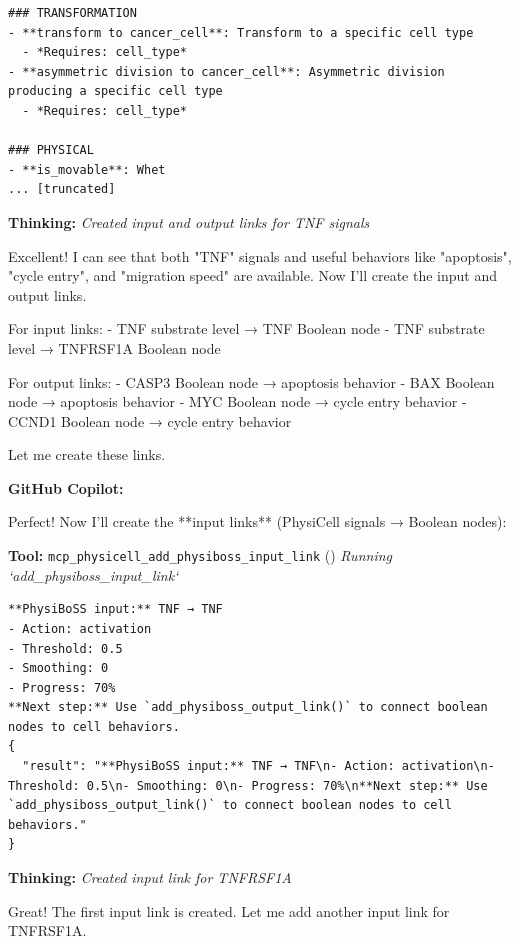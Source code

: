 \documentclass[11pt,a4paper]{article}
\begin{document}
\begin{toolokbox}
\begin{lstlisting}
### TRANSFORMATION
- **transform to cancer_cell**: Transform to a specific cell type
  - *Requires: cell_type*
- **asymmetric division to cancer_cell**: Asymmetric division producing a specific cell type
  - *Requires: cell_type*

### PHYSICAL
- **is_movable**: Whet
... [truncated]
\end{lstlisting}
\end{toolokbox}
\begin{thinkbox}
\textbf{Thinking:} \textit{Created input and output links for TNF signals}

Excellent! I can see that both "TNF" signals and useful behaviors like "apoptosis", "cycle entry", and "migration speed" are available. Now I'll create the input and output links.

For input links:
- TNF substrate level → TNF Boolean node 
- TNF substrate level → TNFRSF1A Boolean node

For output links:
- CASP3 Boolean node → apoptosis behavior
- BAX Boolean node → apoptosis behavior  
- MYC Boolean node → cycle entry behavior
- CCND1 Boolean node → cycle entry behavior

Let me create these links.

\end{thinkbox}
\begin{copilotbox}
\textbf{GitHub Copilot:}

Perfect! Now I'll create the **input links** (PhysiCell signals → Boolean nodes):

\end{copilotbox}
\begin{toolokbox}
\textbf{Tool:} \texttt{mcp\_physicell\_add\_physiboss\_input\_link} (\checkmark)
\textit{Running `add\_physiboss\_input\_link`}
\begin{lstlisting}
**PhysiBoSS input:** TNF → TNF
- Action: activation
- Threshold: 0.5
- Smoothing: 0
- Progress: 70%
**Next step:** Use `add_physiboss_output_link()` to connect boolean nodes to cell behaviors.
{
  "result": "**PhysiBoSS input:** TNF → TNF\n- Action: activation\n- Threshold: 0.5\n- Smoothing: 0\n- Progress: 70%\n**Next step:** Use `add_physiboss_output_link()` to connect boolean nodes to cell behaviors."
}
\end{lstlisting}
\end{toolokbox}
\begin{thinkbox}
\textbf{Thinking:} \textit{Created input link for TNFRSF1A}

Great! The first input link is created. Let me add another input link for TNFRSF1A.

\end{thinkbox}
\end{document}
